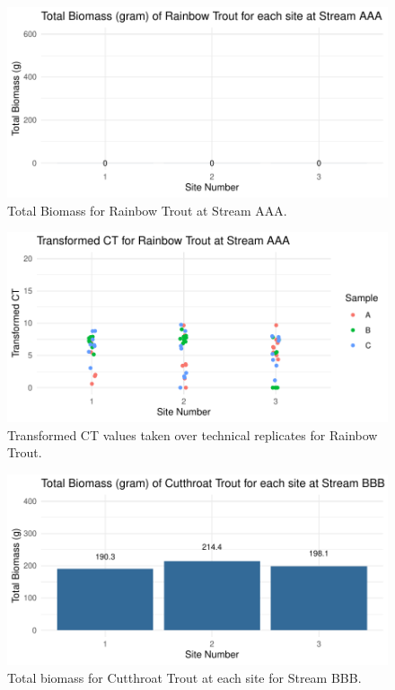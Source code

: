 \begin{figure}[H]
\centering
\includegraphics{AppendixImages/AAA_Rb_new.pdf}
\caption{\hspace{1mm}   Total Biomass for Rainbow Trout at Stream AAA.}
\label{fig:AAA_rb_new}
\end{figure}



\begin{figure}[H]
\centering
\includegraphics{AppendixImages/AAA_rb_tct.pdf}
\caption{ \hspace{1mm}    Transformed CT values taken over technical replicates for Rainbow Trout.}
\label{fig:AAA_rb}
\end{figure}





\begin{figure}[H]
\centering
\includegraphics{AppendixImages/BBB_Ct_new.pdf}
\caption{ \hspace{1mm}    Total biomass for Cutthroat Trout at each site for Stream BBB.}
\label{fig:testBBBbiom2}
\end{figure}





